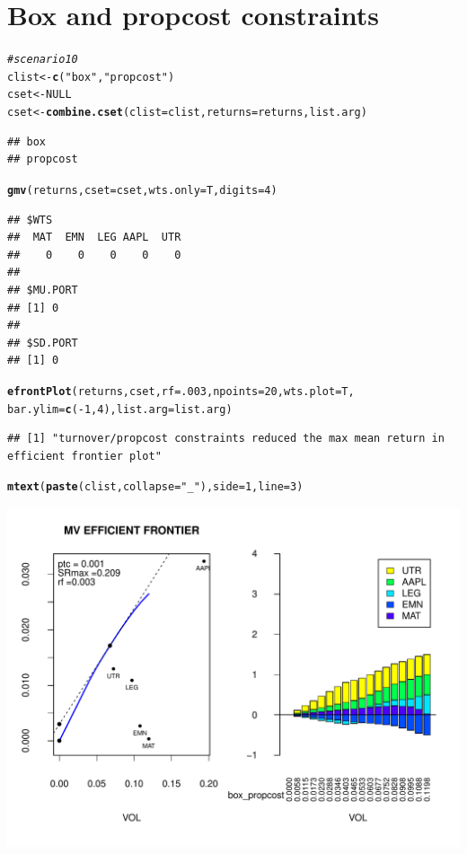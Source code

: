 \documentclass{uwstat518}\usepackage[]{graphicx}\usepackage[]{color}
\makeatletter
\def\maxwidth{ %
  \ifdim\Gin@nat@width>\linewidth
    \linewidth
  \else
    \Gin@nat@width
  \fi
}
\newcommand{\hlstr}[1]{\textcolor[rgb]{0.192,0.494,0.8}{#1}}%
\newcommand{\hlcom}[1]{\textcolor[rgb]{0.678,0.584,0.686}{\textit{#1}}}%
\newcommand{\hlkwd}[1]{\textcolor[rgb]{0.737,0.353,0.396}{\textbf{#1}}}%
\newenvironment{kframe}{%
 \def\at@end@of@kframe{}%
 \ifinner\ifhmode%
  \def\at@end@of@kframe{\end{minipage}}%
  \begin{minipage}{\columnwidth}%
 \fi\fi%
 \def\FrameCommand##1{\hskip\@totalleftmargin \hskip-\fboxsep
 \colorbox{shadecolor}{##1}\hskip-\fboxsep
     \hskip-\linewidth \hskip-\@totalleftmargin \hskip\columnwidth}%
 \MakeFramed {\advance\hsize-\width
   \@totalleftmargin\z@ \linewidth\hsize
   \@setminipage}}%
 {\par\unskip\endMakeFramed%
 \at@end@of@kframe}
\newenvironment{knitrout}{}{} %
\makeatother
\begin{document}
\newpage
\section{Box and propcost constraints}
\begin{knitrout}
\color{fgcolor}\begin{kframe}
\begin{alltt}
\hlcom{# scenario 10}
clist <- \hlkwd{c}(\hlstr{"box"},\hlstr{"propcost"})
cset <- NULL
cset <-\hlkwd{combine.cset}(clist=clist,returns=returns,list.arg)
\end{alltt}
\begin{verbatim}
## box 
## propcost
\end{verbatim}
\begin{alltt}
\hlkwd{gmv}(returns, cset=cset, wts.only=T,digits=4)
\end{alltt}
\begin{verbatim}
## $WTS
##  MAT  EMN  LEG AAPL  UTR 
##    0    0    0    0    0 
## 
## $MU.PORT
## [1] 0
## 
## $SD.PORT
## [1] 0
\end{verbatim}
\begin{alltt}

\hlkwd{efrontPlot}(returns, cset, rf = .003, npoints = 20,wts.plot = T,
		bar.ylim = \hlkwd{c}(-1,4),list.arg=list.arg)
\end{alltt}
\begin{verbatim}
## [1] "turnover/propcost constraints reduced the max mean return in efficient frontier plot"
\end{verbatim}
\begin{alltt}
\hlkwd{mtext}(\hlkwd{paste}(clist,collapse=\hlstr{"_"}),side=1,line=3)
\end{alltt}
\end{kframe}
\includegraphics[width=\maxwidth]{figure/unnamed-chunk-13} 
\begin{kframe}\begin{alltt}


\end{alltt}
\end{kframe}
\end{knitrout}
\end{document}
